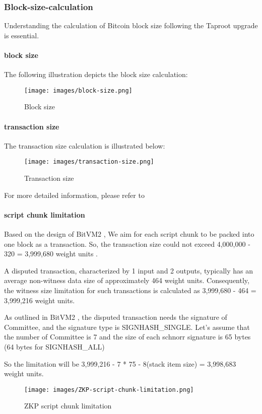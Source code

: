 \subsubsection{Block-size-calculation}

Understanding the calculation of Bitcoin block size following the Taproot upgrade is essential.

\paragraph*{block size}

The following illustration depicts the block size calculation:

\begin{figure}[ht] 
    \centering  
    \texttt{[image: images/block-size.png]} 
    \caption{Block size}
    \label{fig:block-size}
\end{figure}

\paragraph*{transaction size}

The transaction size calculation is illustrated below:

\begin{figure}[ht] 
    \centering  
    \texttt{[image: images/transaction-size.png]} 
    \caption{Transaction size}
    \label{fig:transaction-size}
\end{figure}

For more detailed information, please refer to \cite{website:transaction-size}

\paragraph*{script chunk limitation}

Based on the design of BitVM2 \cite{website:BitVM2}, We aim for each script chunk to be packed into one block as a transaction.
So, the transaction size could not exceed 4,000,000 - 320 = 3,999,680 weight units \cite{website:transaction-size}.

A disputed transaction, characterized by 1 input and 2 outputs, typically has an average non-witness data size of approximately 464 weight units. 
Consequently, the witness size limitation for such transactions is calculated as 3,999,680 - 464 = 3,999,216 weight units.

As outlined in BitVM2 \cite{website:BitVM2}, the disputed transaction needs the signature of Committee, and the signature type is
SIGNHASH\_SINGLE. Let's assume that the number of Committee is 7 and the size of each schnorr signature is 65 bytes (64 bytes for SIGNHASH\_ALL)

So the limitation will be 3,999,216 - 7 * 75 - 8(stack item size) = 3,998,683 weight units.

\begin{figure}[ht] 
    \centering  
    \texttt{[image: images/ZKP-script-chunk-limitation.png]} 
    \caption{ZKP script chunk limitation}
    \label{fig:ZKP-script-chunk-limitation}
\end{figure}
